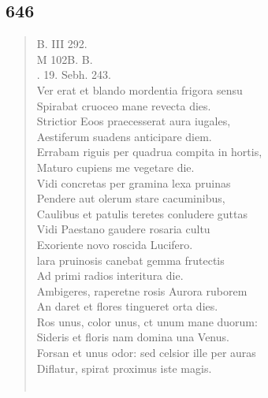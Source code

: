 \documentclass[11pt, a4paper]{report}
\begin{document}
            \subsection*{646}
      \begin{verse}
      B. III 292. \\ M 102B. B. \\ . 19. Sebh. 243. \\ Ver erat et blando mordentia frigora sensu \\ Spirabat cruoceo mane revecta dies. \\ Strictior Eoos praecesserat aura iugales, \\ Aestiferum suadens anticipare diem. \\ Errabam riguis per quadrua compita in hortis, \\ Maturo cupiens me vegetare die. \\ Vidi concretas per gramina lexa pruinas \\ Pendere aut olerum stare cacuminibus, \\ Caulibus et patulis teretes conludere guttas \\ Vidi Paestano gaudere rosaria cultu \\ Exoriente novo roscida Lucifero. \\ lara pruinosis canebat gemma frutectis \\ Ad primi radios interitura die. \\ Ambigeres, raperetne rosis Aurora ruborem \\ An daret et flores tingueret orta dies. \\ Ros unus, color unus, ct unum mane duorum: \\ Sideris et floris nam domina una Venus. \\ Forsan et unus odor: sed celsior ille per auras \\ Diflatur, spirat proximus iste magis. \\ 
        ﻿\pagebreak 

\end{verse}
\end{document}
